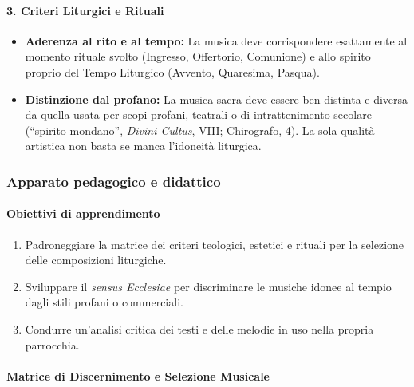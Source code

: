 \documentclass[12pt,a4paper]{article}
\begin{document}
	\paragraph{3. Criteri Liturgici e Rituali}\label{criteri-liturgici-e-rituali}
	
	\begin{itemize}[leftmargin=*]
		\item \textbf{Aderenza al rito e al tempo:} La musica deve corrispondere esattamente al momento rituale svolto (Ingresso, Offertorio, Comunione) e allo spirito proprio del Tempo Liturgico (Avvento, Quaresima, Pasqua).
		\item \textbf{Distinzione dal profano:} La musica sacra deve essere ben distinta e diversa da quella usata per scopi profani, teatrali o di intrattenimento secolare (``spirito mondano'', \emph{Divini Cultus}, VIII; Chirografo, 4). La sola qualità artistica non basta se manca l'idoneità liturgica.
	\end{itemize}
	
	\subsubsection{Apparato pedagogico e didattico}\label{apparato-pedagogico-e-didattico-5}
	
	\paragraph{Obiettivi di apprendimento}\label{obiettivi-di-apprendimento-5}
	
	\begin{enumerate}[label=\arabic*.,leftmargin=*]
		\item Padroneggiare la matrice dei criteri teologici, estetici e rituali per la selezione delle composizioni liturgiche.
		\item Sviluppare il \emph{sensus Ecclesiae} per discriminare le musiche idonee al tempio dagli stili profani o commerciali.
		\item Condurre un'analisi critica dei testi e delle melodie in uso nella propria parrocchia.
	\end{enumerate}
	
	\paragraph{Matrice di Discernimento e Selezione Musicale}\label{matrice-di-discernimento-e-selezione-musicale}
	
\end{document}
